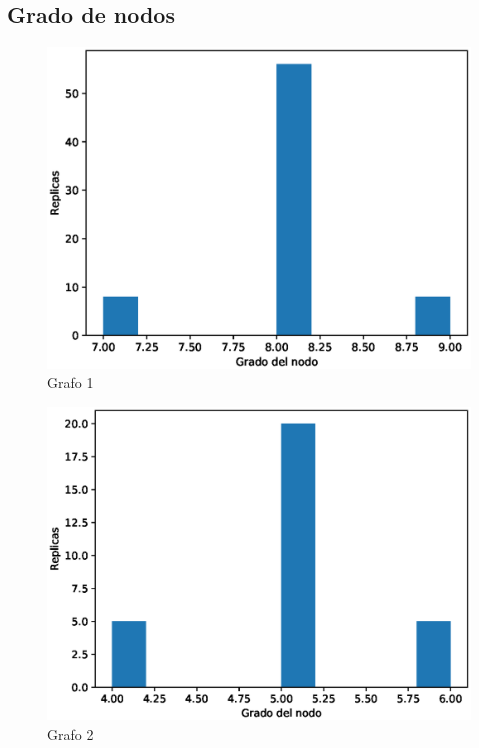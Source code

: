 \documentclass{article}
\begin{document}
\subsection{Grado de nodos}
\begin{figure}[H]
    \includegraphics[scale=0.6]{hist-grados-1}
    \caption{Grafo 1}
    \label{fig:matriz}
\end{figure}
\begin{figure}[H]
    \includegraphics[scale=0.6]{hist-grados-2}
    \caption{Grafo 2}
    \label{fig:matriz}
\end{figure}
\end{document}
